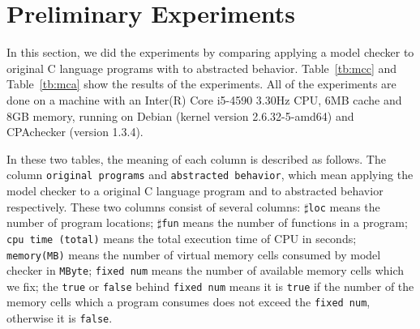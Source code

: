 \section{Preliminary Experiments}
\label{sec:experiment}
In this section, we did the experiments by comparing applying a model
checker to original C language programs with to abstracted
behavior. Table~\ref{tb:mcc} and Table~\ref{tb:mca} show the results
of the experiments. All of the experiments are done on a machine with
an Inter(R) Core i5-4590 3.30Hz CPU, 6MB cache and 8GB memory, running
on Debian (kernel version 2.6.32-5-amd64) and CPAchecker (version 1.3.4).

In these two tables, the meaning of each column is described as
follows. The column \texttt{original programs} and \texttt{abstracted behavior},
which mean applying the model checker to a original C language
program and to abstracted behavior respectively. These two columns
consist of several columns: $\sharp$\texttt{loc} means the number of
program locations; $\sharp$\texttt{fun} means the number of functions
in a program; \texttt{cpu time (total)} means the total execution time
of CPU in seconds; \texttt{memory(MB)} means the number of virtual
memory cells consumed by model checker in \texttt{MByte};
\texttt{fixed num} means the number of available memory cells which we
fix; the \texttt{true} or \texttt{false} behind \texttt{fixed num}
means it is \texttt{true} if the number of the memory cells which a
program consumes does not exceed the \texttt{fixed num}, otherwise it
is \texttt{false}.

